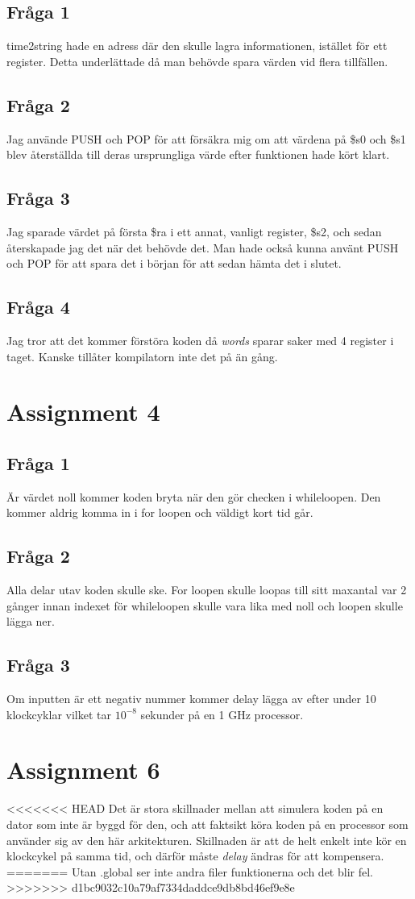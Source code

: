 \documentclass[a4paper,11p]{article}
\begin{document}
\subsection{Fråga 1}
time2string hade en adress där den skulle lagra informationen, istället för ett register. Detta underlättade då man behövde spara värden vid flera tillfällen. 
\subsection{Fråga 2}
Jag använde PUSH och POP för att försäkra mig om att värdena på \$s0 och \$s1 blev återställda till deras ursprungliga värde efter funktionen hade kört klart.
\subsection{Fråga 3}
Jag sparade värdet på första \$ra i ett annat, vanligt register, \$s2, och sedan återskapade jag det när det behövde det. Man hade också kunna använt PUSH och POP för att spara det i början för att sedan hämta det i slutet.
\subsection{Fråga 4}
Jag tror att det kommer förstöra koden då \emph{words} sparar saker med 4 register i taget. Kanske tillåter kompilatorn inte det på än gång. 
\section{Assignment 4}
\subsection{Fråga 1}
Är värdet noll kommer koden bryta när den gör checken i whileloopen. Den kommer aldrig komma in i for loopen och väldigt kort tid går.
\subsection{Fråga 2}
Alla delar utav koden skulle ske. For loopen skulle loopas till sitt maxantal var 2 gånger innan indexet för whileloopen skulle vara lika med noll och loopen skulle lägga ner.
\subsection{Fråga 3}
Om inputten är ett negativ nummer kommer delay lägga av efter under 10 klockcyklar vilket tar $10^{-8}$ sekunder på en 1 GHz processor.
\section{Assignment 6}
<<<<<<< HEAD
Det är stora skillnader mellan att simulera koden på en dator som inte är byggd för den, och att faktsikt köra koden på en processor som använder sig av den här arkitekturen. Skillnaden är att de helt enkelt inte kör en klockcykel på samma tid, och därför måste \emph{delay} ändras för att kompensera.
=======
Utan .global ser inte andra filer funktionerna och det blir fel.
>>>>>>> d1bc9032c10a79af7334daddce9db8bd46ef9e8e
\end{document}
